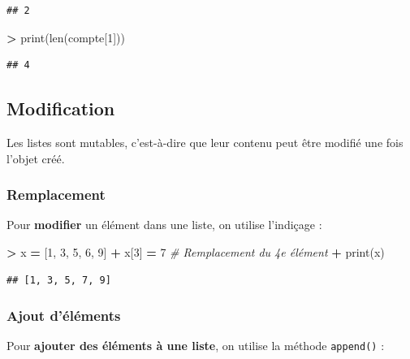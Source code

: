 \documentclass[12pt,]{book}
\newenvironment{Shaded}{\begin{snugshade}}{\end{snugshade}}
\newcommand{\DecValTok}[1]{\textcolor[rgb]{0.00,0.00,0.81}{#1}}
\newcommand{\CommentTok}[1]{\textcolor[rgb]{0.56,0.35,0.01}{\textit{#1}}}
\newcommand{\OperatorTok}[1]{\textcolor[rgb]{0.81,0.36,0.00}{\textbf{#1}}}
\newcommand{\BuiltInTok}[1]{#1}
\newcommand{\NormalTok}[1]{#1}
\numberwithin{equation}{section}
\numberwithin{countremarque}{section}
\begin{document}
\begin{lstlisting}
## 2
\end{lstlisting}

\begin{Shaded}
\begin{Highlighting}[]
\OperatorTok{>} \BuiltInTok{print}\NormalTok{(}\BuiltInTok{len}\NormalTok{(compte[}\DecValTok{1}\NormalTok{]))}
\end{Highlighting}
\end{Shaded}

\begin{lstlisting}
## 4
\end{lstlisting}

\subsection{Modification}\label{modification}

Les listes sont mutables, c'est-à-dire que leur contenu peut être
modifié une fois l'objet créé.

\subsubsection{Remplacement}\label{remplacement}

Pour \textbf{modifier} un élément dans une liste, on utilise l'indiçage
:

\begin{Shaded}
\begin{Highlighting}[]
\OperatorTok{>}\NormalTok{ x }\OperatorTok{=}\NormalTok{ [}\DecValTok{1}\NormalTok{, }\DecValTok{3}\NormalTok{, }\DecValTok{5}\NormalTok{, }\DecValTok{6}\NormalTok{, }\DecValTok{9}\NormalTok{]}
\OperatorTok{+}\NormalTok{ x[}\DecValTok{3}\NormalTok{] }\OperatorTok{=} \DecValTok{7} \CommentTok{# Remplacement du 4e élément}
\OperatorTok{+} \BuiltInTok{print}\NormalTok{(x)}
\end{Highlighting}
\end{Shaded}

\begin{lstlisting}
## [1, 3, 5, 7, 9]
\end{lstlisting}

\subsubsection{Ajout d'éléments}\label{ajout-delements}

Pour \textbf{ajouter des éléments à une liste}, on utilise la méthode
\texttt{append()} :
\end{document}
